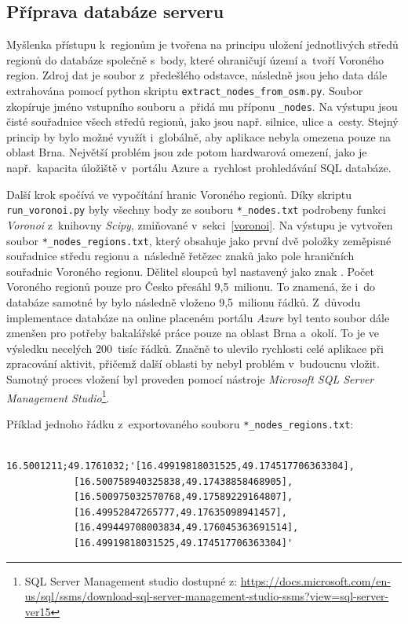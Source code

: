 \subsection{Příprava databáze serveru}
\label{SQLDB}
Myšlenka přístupu k~regionům je tvořena na principu uložení jednotlivých středů regionů do databáze společně s~body, které ohraničují území a~tvoří Voroného region. Zdroj dat je soubor z~předešlého odstavce, následně jsou jeho data dále extrahována pomocí python skriptu \texttt{extract\_nodes\_from\_osm.py}. Soubor zkopíruje jméno vstupního souboru a~přidá mu příponu \texttt{\_nodes}. Na výstupu jsou čisté souřadnice všech středů regionů, jako jsou např. silnice, ulice a~cesty. Stejný princip by bylo možné využít i~globálně, aby aplikace nebyla omezena pouze na oblast Brna. Největší problém jsou zde potom hardwarová omezení, jako je např.~kapacita úložiště v~portálu Azure a~rychlost prohledávání SQL databáze. 

Další krok spočívá ve vypočítání hranic Voroného regionů. Díky skriptu \texttt{run\_voronoi.py} byly všechny body ze souboru \texttt{*\_nodes.txt} podrobeny funkci \emph{Voronoi} z~knihovny \emph{Scipy}, zmiňované v~sekci~\ref{voronoi}. Na výstupu je vytvořen soubor \texttt{*\_nodes\_regions.txt}, který obsahuje jako první dvě položky zeměpisné souřadnice středu regionu a~následně řetězec znaků jako pole hraničních souřadnic Voroného regionu. Dělitel sloupců byl nastavený jako znak \uv{;}. Počet Voroného regionů pouze pro Česko přesáhl 9,5~milionu. To znamená, že i~do databáze samotné by bylo následně vloženo 9,5~milionu řádků. Z~důvodu implementace databáze na online placeném portálu \emph{Azure} byl tento soubor dále zmenšen pro potřeby bakalářské práce pouze na oblast Brna a~okolí. To je ve výsledku necelých 200~tisíc řádků. Značně to ulevilo rychlosti celé aplikace při zpracování aktivit, přičemž další oblasti by nebyl problém v~budoucnu vložit. Samotný proces vložení byl proveden pomocí nástroje \emph{Microsoft SQL Server Management Studio}\footnote{SQL Server Management studio dostupné z: \url{https://docs.microsoft.com/en-us/sql/ssms/download-sql-server-management-studio-ssms?view=sql-server-ver15}}.

Příklad jednoho řádku z~exportovaného souboru \texttt{*\_nodes\_regions.txt}:
\begin{verbatim}
            16.5001211;49.1761032;'[16.49919818031525,49.174517706363304],
            [16.500758940325838,49.17438858468905],
            [16.500975032570768,49.17589229164807],
            [16.49952847265777,49.17635098941457],
            [16.499449708003834,49.176045363691514],
            [16.49919818031525,49.174517706363304]'
\end{verbatim}
